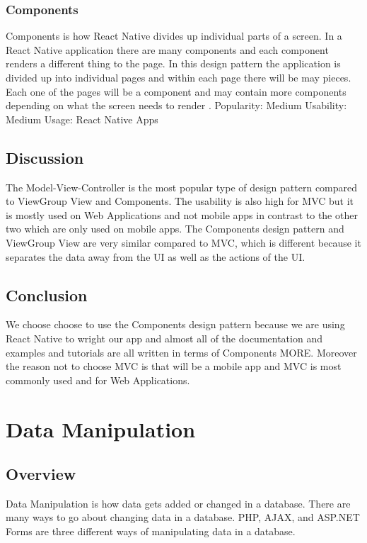 \documentclass[compsoc, 10, draftclsnofoot, onecolumn]{IEEEtran}
\begin{document}
\subsubsection{Components}
\indent Components is how React Native divides up individual parts of a screen. In a React Native application there are many components and each component renders a different thing to the page. In this design pattern the application is divided up into individual pages and within each page there will be may pieces. Each one of the pages will be a component and may contain more components depending on what the screen needs to render \cite{r5}.	 
\newline
Popularity: Medium
\newline
Usability: Medium
\newline
Usage: React Native Apps
\newline
\newline
\subsection{Discussion} The Model-View-Controller is the most popular type of design pattern compared to ViewGroup View and Components. The usability is also high for MVC but it is mostly used on Web Applications and not mobile apps in contrast to the other two which are only used on mobile apps. The Components design pattern and ViewGroup View are very similar compared to MVC, which is different because it separates the data away from the UI as well as the actions of the UI.
\subsection{Conclusion}We choose choose to use the Components design pattern because we are using React Native to wright our app and almost all of the documentation and examples and tutorials are all written in terms of Components MORE. Moreover the reason not to choose MVC is that will be a mobile app and MVC is most commonly used and for Web Applications. 
\section{\textbf{Data Manipulation}}
\subsection{Overview} Data Manipulation is how data gets added or changed in a database. There are many ways to go about changing data in a database. PHP, AJAX, and ASP.NET Forms are three different ways of manipulating data in a database.
\end{document}
